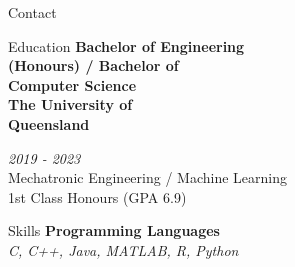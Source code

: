 \documentclass{custom-resume}
\begin{document}
\selectfont


\TitleRule


\begin{minipage}[t]{0.25\textwidth}

  \raggedright


  \begin{section}{Contact}
  \end{section}

  \SectionRule


  \begin{section}{Education}
    {
      \small
      \textbf{Bachelor of Engineering\\ (Honours) / Bachelor of\\ Computer Science}
    } \\[8pt]

    {
      \large
      \textbf{The University of\\ Queensland} \\[8pt]
    }

    \textit{2019 - 2023} \\[8pt]

    Mechatronic Engineering / Machine Learning \\[8pt]

    1st Class Honours (GPA 6.9)

  \end{section}

  \SectionRule


  \begin{section}{Skills}
    \textbf{Programming Languages} \\[2pt]
    \textit{C, C++, Java, MATLAB, R, Python} \\[8pt]


\end{section}
\end{minipage}
\end{document}
